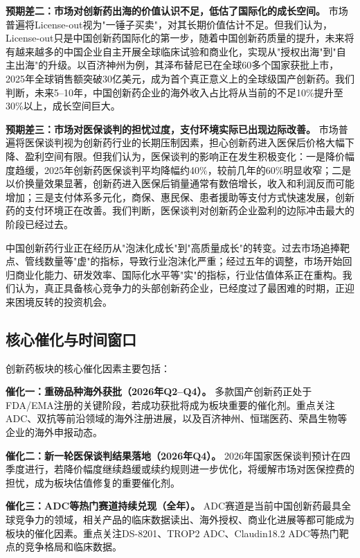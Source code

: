\textbf{预期差二：市场对创新药出海的价值认识不足，低估了国际化的成长空间。} 市场普遍将License-out视为"一锤子买卖"，对其长期价值估计不足。但我们认为，License-out只是中国创新药国际化的第一步，随着中国创新药质量的提升，未来将有越来越多的中国企业自主开展全球临床试验和商业化，实现从"授权出海"到"自主出海"的升级。以百济神州为例，其泽布替尼已在全球60多个国家获批上市，2025年全球销售额突破30亿美元，成为首个真正意义上的全球级国产创新药。我们判断，未来5--10年，中国创新药企业的海外收入占比将从当前的不足10\%提升至30\%以上，成长空间巨大。

\textbf{预期差三：市场对医保谈判的担忧过度，支付环境实际已出现边际改善。} 市场普遍将医保谈判视为创新药行业的长期压制因素，担心创新药进入医保后价格大幅下降、盈利空间有限。但我们认为，医保谈判的影响正在发生积极变化：一是降价幅度趋缓，2025年创新药医保谈判平均降幅约40\%，较前几年的60\%明显收窄；二是以价换量效果显著，创新药进入医保后销量通常有数倍增长，收入和利润反而可能增加；三是支付体系多元化，商保、惠民保、患者援助等支付方式快速发展，创新药的支付环境正在改善。我们判断，医保谈判对创新药企业盈利的边际冲击最大的阶段已经过去。

\begin{keyinsight}
中国创新药行业正在经历从"泡沫化成长"到"高质量成长"的转变。过去市场追捧靶点、管线数量等"虚"的指标，导致行业泡沫化严重；经过五年的调整，市场开始回归商业化能力、研发效率、国际化水平等"实"的指标，行业估值体系正在重构。我们认为，真正具备核心竞争力的头部创新药企业，已经度过了最困难的时期，正迎来困境反转的投资机会。
\end{keyinsight}

\subsection{核心催化与时间窗口}

创新药板块的核心催化因素主要包括：

\textbf{催化一：重磅品种海外获批（2026年Q2--Q4）。} 多款国产创新药正处于FDA/EMA注册的关键阶段，若成功获批将成为板块重要的催化剂。重点关注ADC、双抗等前沿领域的海外注册进展，以及百济神州、恒瑞医药、荣昌生物等企业的海外申报动态。

\textbf{催化二：新一轮医保谈判结果落地（2026年Q4）。} 2026年国家医保谈判预计在四季度进行，若降价幅度继续趋缓或续约规则进一步优化，将缓解市场对医保控费的担忧，成为板块估值修复的重要催化剂。

\textbf{催化三：ADC等热门赛道持续兑现（全年）。} ADC赛道是当前中国创新药最具全球竞争力的领域，相关产品的临床数据读出、海外授权、商业化进展等都可能成为板块的催化因素。重点关注DS-8201、TROP2 ADC、Claudin18.2 ADC等热门靶点的竞争格局和临床数据。


